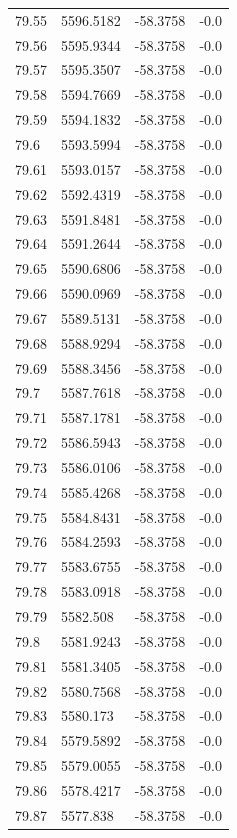 \begin{table}[H]
\begin{tabular}{llll}
79.55 & 5596.5182 & -58.3758 & -0.0 \\
79.56 & 5595.9344 & -58.3758 & -0.0 \\
79.57 & 5595.3507 & -58.3758 & -0.0 \\
79.58 & 5594.7669 & -58.3758 & -0.0 \\
79.59 & 5594.1832 & -58.3758 & -0.0 \\
79.6 & 5593.5994 & -58.3758 & -0.0 \\
79.61 & 5593.0157 & -58.3758 & -0.0 \\
79.62 & 5592.4319 & -58.3758 & -0.0 \\
79.63 & 5591.8481 & -58.3758 & -0.0 \\
79.64 & 5591.2644 & -58.3758 & -0.0 \\
79.65 & 5590.6806 & -58.3758 & -0.0 \\
79.66 & 5590.0969 & -58.3758 & -0.0 \\
79.67 & 5589.5131 & -58.3758 & -0.0 \\
79.68 & 5588.9294 & -58.3758 & -0.0 \\
79.69 & 5588.3456 & -58.3758 & -0.0 \\
79.7 & 5587.7618 & -58.3758 & -0.0 \\
79.71 & 5587.1781 & -58.3758 & -0.0 \\
79.72 & 5586.5943 & -58.3758 & -0.0 \\
79.73 & 5586.0106 & -58.3758 & -0.0 \\
79.74 & 5585.4268 & -58.3758 & -0.0 \\
79.75 & 5584.8431 & -58.3758 & -0.0 \\
79.76 & 5584.2593 & -58.3758 & -0.0 \\
79.77 & 5583.6755 & -58.3758 & -0.0 \\
79.78 & 5583.0918 & -58.3758 & -0.0 \\
79.79 & 5582.508 & -58.3758 & -0.0 \\
79.8 & 5581.9243 & -58.3758 & -0.0 \\
79.81 & 5581.3405 & -58.3758 & -0.0 \\
79.82 & 5580.7568 & -58.3758 & -0.0 \\
79.83 & 5580.173 & -58.3758 & -0.0 \\
79.84 & 5579.5892 & -58.3758 & -0.0 \\
79.85 & 5579.0055 & -58.3758 & -0.0 \\
79.86 & 5578.4217 & -58.3758 & -0.0 \\
79.87 & 5577.838 & -58.3758 & -0.0 \\

\end{tabular}
\end{table}
